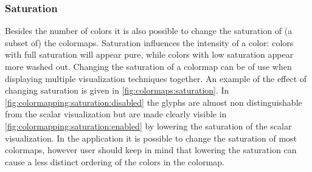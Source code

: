 \subsubsection{Saturation} %
\label{ssub:saturation}
Besides the number of colors it is also possible to change the saturation of (a subset of) the colormaps. Saturation influences the intensity of a color: colors with full saturation will appear pure, while colors with low saturation appear more washed out. Changing the saturation of a colormap can be of use when displaying multiple visualization techniques together. An example of the effect of changing saturation is given in \cref{fig:colormaps:saturation}. In \cref{fig:colormapping:saturation:disabled} the glyphs are almost non distinguishable from the scalar visualization but are made clearly visible in \cref{fig:colormapping:saturation:enabled} by lowering the saturation of the scalar visualization. In the application it is possible to change the saturation of most colormaps, however user should keep in mind that lowering the saturation can cause a less distinct ordering of the colors in the colormap.

